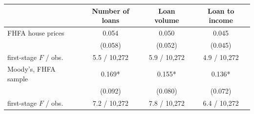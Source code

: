 \begin{tabular}{lccc}
\toprule
 & Number of loans & Loan volume & Loan to income \\
\midrule
FHFA house prices & 0.054 & 0.050 & 0.045 \\
 & (0.058) & (0.052) & (0.045) \\
\quad first-stage $F$ / obs. & 5.5 / 10,272 & 5.9 / 10,272 & 4.9 / 10,272 \\
Moody's, FHFA sample & 0.169* & 0.155* & 0.136* \\
 & (0.092) & (0.080) & (0.072) \\
\quad first-stage $F$ / obs. & 7.2 / 10,272 & 7.8 / 10,272 & 6.4 / 10,272 \\
\bottomrule
\end{tabular}